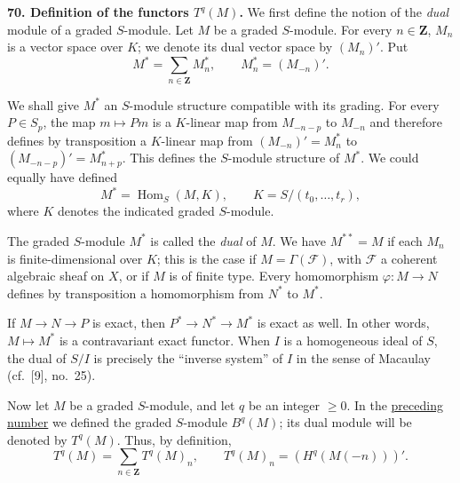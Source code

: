 
\label{fac:III:4:no:70}
\textbf{70. Definition of the functors $T^q(M)$.}
We first define the notion of the \textit{dual} module of a graded
$S$-module. Let $M$ be a graded $S$-module. For every
$n\in\mathbf{Z}$, $M_n$ is a vector space over $K$; we denote its dual
vector space by $(M_n)'$. Put
\label{fac:III:4:no:70:def:dual-module}
\[
M^*=\sum_{n\in\mathbf{Z}}M_n^*,
\qquad M_n^*=(M_{-n})'.
\]

We shall give $M^*$ an $S$-module structure compatible with its grading.
\label{fac:III:4:no:70:formula:dual-action}
For every $P\in S_p$, the map $m\mapsto Pm$ is a $K$-linear map from
$M_{-n-p}$ to $M_{-n}$ and therefore defines by transposition a
$K$-linear map from $(M_{-n})'=M_n^*$ to
$(M_{-n-p})'=M_{n+p}^*$. This defines the $S$-module structure of
$M^*$.
\label{fac:III:4:no:70:formula:dual-Hom}
We could equally have defined
\[
M^*=\operatorname{Hom}_S(M,K),
\qquad K=S/(t_0,\ldots,t_r),
\]
where $K$ denotes the indicated graded $S$-module.

\label{fac:III:4:no:70:property:bidual}
The graded $S$-module $M^*$ is called the \textit{dual} of $M$. We have
$M^{**}=M$ if each $M_n$ is finite-dimensional over $K$; this is the
case if $M=\Gamma(\mathcal{F})$, with $\mathcal{F}$ a coherent algebraic
sheaf on $X$, or if $M$ is of finite type. Every homomorphism
$\varphi:M\longrightarrow N$ defines by transposition a homomorphism
from $N^*$ to $M^*$.

\label{fac:III:4:no:70:property:dual-exact}
If $M\longrightarrow N\longrightarrow P$ is exact, then
$P^*\longrightarrow N^*\longrightarrow M^*$ is exact as well. In other
words, $M\mapsto M^*$ is a contravariant exact functor.
\label{fac:III:4:no:70:property:inverse-system}
When $I$ is a
homogeneous ideal of $S$, the dual of $S/I$ is precisely the ``inverse
system'' of $I$ in the sense of Macaulay (cf.~[9], no.~25).

Now let $M$ be a graded $S$-module, and let $q$ be an integer $\geq0$.
In the \hyperref[fac:III:4:no:69]{preceding number} we defined the graded $S$-module
\hyperref[fac:III:4:no:69:def:Bq]{$B^q(M)$}; its dual module will be
denoted by $T^q(M)$. Thus, by definition,
\label{fac:III:4:no:70:def:Tq}
\[
T^q(M)=\sum_{n\in\mathbf{Z}}T^q(M)_n,
\qquad T^q(M)_n=(H^q(M(-n)))'.
\]

